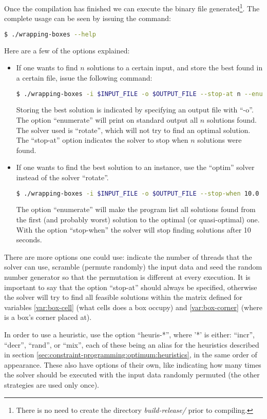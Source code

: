 Once the compilation has finished we can execute the binary file generated\footnote{ There
is no need to create the directory \textit{build-release/} prior to compiling.}. The
complete usage can be seen by issuing the command:
\begin{lstlisting}[language=bash]
$ ./wrapping-boxes --help
\end{lstlisting}

Here are a few of the options explained:
\begin{itemize}
	\item If one wants to find $n$ solutions to a certain input, and store the
	best found in a certain file, issue the following command:
\begin{lstlisting}[language=bash]
$ ./wrapping-boxes -i $INPUT_FILE -o $OUTPUT_FILE --stop-at n --enumerate --rotate
\end{lstlisting}
	
	Storing the best solution is indicated by specifying an output file with ``-o''.
	The option ``enumerate'' will print on standard output all $n$ solutions found.
	The solver used is ``rotate'', which will not try to find an optimal solution.
	The ``stop-at'' option indicates the solver to stop when $n$ solutions were
	found.
	
	\item If one wants to find the best solution to an instance, use the ``optim'' solver
	instead of the solver ``rotate''.
\begin{lstlisting}[language=bash]
$ ./wrapping-boxes -i $INPUT_FILE -o $OUTPUT_FILE --stop-when 10.0 --enumerate --optim
\end{lstlisting}
	
	The option ``enumerate'' will make the program list all solutions found from
	the first (and probably worst) solution to the optimal (or quasi-optimal) one.
	With the option ``stop-when'' the solver will stop finding solutions after 10 seconds.
\end{itemize}

There are more options one could use: indicate the number of threads that the solver
can use, scramble (permute randomly) the input data and seed the random number generator
so that the permutation is different at every execution. It is important to say that
the option ``stop-at'' should always be specified, otherwise the solver will try to
find all feasible solutions within the matrix defined for variables \ref{var:box-cell}
(what cells does a box occupy) and \ref{var:box-corner} (where is a box's corner placed at).

\hfill

In order to use a heuristic, use the option ``heuris-*'', where '*' is either: ``incr'',
``decr'', ``rand'', or ``mix'', each of these being an alias for the heuristics
described in section \ref{sec:constraint-programming:optimum:heuristics}, in the same
order of appearance. These also have options of their own, like indicating how many
times the solver should be executed with the input data randomly permuted (the other
strategies are used only once).

